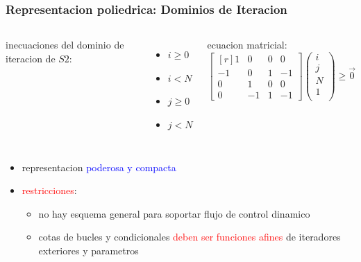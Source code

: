 \documentclass{beamer}\usetheme{Madrid} %
\begin{document}
\begin{frame}
\frametitle{Representacion poliedrica: Dominios de Iteracion}
\begin{columns}
inecuaciones del dominio de iteracion de $S2$: 
\begin{itemize}
\item $ i \geq 0 $
\item $ i  < N $
\item $ j \geq 0 $
\item $ j < N $
\end{itemize}
ecuacion matricial: 
$$
\begin{bmatrix*}[r] 1 &  0 & 0 &  0 \\ 
                               -1 &  0 & 1 & -1 \\ 
                                0 &  1 & 0 &  0 \\
                                0 & -1 & 1 & -1 \end{bmatrix*} 
            \left( \begin{array}{c} i \\ j \\ N\\ 1\\ \end{array} \right)
            \geq \vec{0}
$$
\end{columns}
\begin{itemize}
\item representacion \textcolor{blue}{poderosa y compacta} 
\item \textcolor{red}{restricciones}:
\begin{itemize}
\item no hay esquema general para soportar flujo de control dinamico
\item cotas de bucles y condicionales \textcolor{red}{deben ser funciones afines}
de iteradores exteriores y parametros
\end{itemize}
\end{itemize} 
\end{frame}
\end{document}
